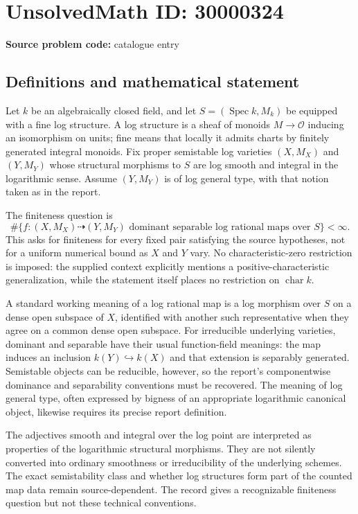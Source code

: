 \documentclass[11pt]{article}
\begin{document}
\section*{UnsolvedMath ID: 30000324}
\textbf{Source problem code:} catalogue entry
\subsection{Definitions and mathematical statement}
Let $k$ be an algebraically closed field, and let $S=(\operatorname{Spec}k,M_k)$ be equipped with a fine log structure. A log structure is a sheaf of monoids $M\to\mathcal O$ inducing an isomorphism on units; fine means that locally it admits charts by finitely generated integral monoids. Fix proper semistable log varieties $(X,M_X)$ and $(Y,M_Y)$ whose structural morphisms to $S$ are log smooth and integral in the logarithmic sense. Assume $(Y,M_Y)$ is of log general type, with that notion taken as in the report.

The finiteness question is
\[
 \#\{f:(X,M_X)\dashrightarrow(Y,M_Y)
       \text{ dominant separable log rational maps over }S\}<\infty.
\]
This asks for finiteness for every fixed pair satisfying the source hypotheses, not for a uniform numerical bound as $X$ and $Y$ vary. No characteristic-zero restriction is imposed: the supplied context explicitly mentions a positive-characteristic generalization, while the statement itself places no restriction on $\operatorname{char}k$.

A standard working meaning of a log rational map is a log morphism over $S$ on a dense open subspace of $X$, identified with another such representative when they agree on a common dense open subspace. For irreducible underlying varieties, dominant and separable have their usual function-field meanings: the map induces an inclusion $k(Y)\hookrightarrow k(X)$ and that extension is separably generated. Semistable objects can be reducible, however, so the report's componentwise dominance and separability conventions must be recovered. The meaning of log general type, often expressed by bigness of an appropriate logarithmic canonical object, likewise requires its precise report definition.

The adjectives smooth and integral over the log point are interpreted as properties of the logarithmic structural morphisms. They are not silently converted into ordinary smoothness or irreducibility of the underlying schemes. The exact semistability class and whether log structures form part of the counted map data remain source-dependent. The record gives a recognizable finiteness question but not these technical conventions.
\end{document}
